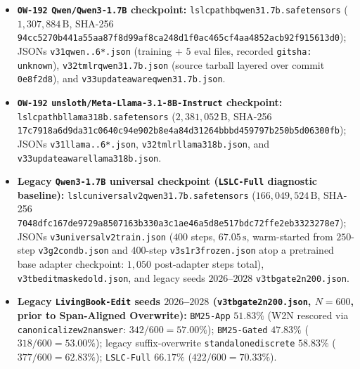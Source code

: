 \documentclass[10pt]{article}
\renewcommand{\_}{\origunderscore\allowbreak}
\begin{document}
\begin{itemize}
    \item \textbf{\texttt{OW-192} \texttt{Qwen/Qwen3-1.7B} checkpoint:} \texttt{lslc\_pathb\_qwen3\_1.7b.safetensors} ($1{,}307{,}884\,\text{B}$, SHA-256 \texttt{\scriptsize\allowbreak 94cc5270b441a55a\allowbreak a87f8d99af8ca248\allowbreak d1f0ac465cf4aa48\allowbreak 52acb92f915613d0}); JSONs \texttt{v31\_qwen\_1..6*.json} (training + $5$ eval files, recorded \texttt{git\_sha: unknown}), \texttt{v32\_tmlr\_qwen3\_1.7b.json} (source tarball layered over commit \texttt{0e8f2d8}), and \texttt{v33\_update\_aware\_qwen3\_1.7b.json}.
    \item \textbf{\texttt{OW-192} \texttt{unsloth/\allowbreak Meta-Llama-3.1-8B-Instruct} checkpoint:} \texttt{lslc\_pathb\_llama31\_8b.safetensors} ($2{,}381{,}052\,\text{B}$, SHA-256\\\texttt{\scriptsize 17c7918a6d9da31c\allowbreak 0640c94e902b8e4a\allowbreak 84d31264bbbd4597\allowbreak 97b250b5d06300fb}); JSONs \texttt{v31\_llama\_1..6*.json}, \texttt{v32\_tmlr\_llama31\_8b.json}, and \texttt{v33\_update\_aware\_llama31\_8b.json}.
    \item \textbf{Legacy \texttt{Qwen3-1.7B} universal checkpoint (\texttt{LSLC-Full} diagnostic baseline):} \texttt{lslc\_universal\_v2\_qwen3\_1.7b.safetensors} ($166{,}049{,}524\,\text{B}$, SHA-256 \texttt{\scriptsize 7048dfc167de9729\allowbreak a8507163b330a3c1\allowbreak ae46a5d8e517bdc7\allowbreak 2ffe2eb3323278e7}); JSONs \texttt{v3\_universal\_\allowbreak v2\_train.json} ($400$ steps, $67.05\,\text{s}$, warm-started from $250$-step \texttt{v3\_g2\_cond\_b.json} and $400$-step \texttt{v3\_s1\_r3\_frozen.json} atop a pretrained base adapter checkpoint: $1{,}050$ post-adapter steps total), \texttt{v3\_tb\_1\_edit\_masked\_old.json}, and legacy seeds $2026$--$2028$ \texttt{v3\_tb\_3\_gate2\_n200.json}.
    \item \textbf{Legacy \texttt{LivingBook-Edit} seeds $2026$--$2028$ (\texttt{v3\_tb\_3\_gate2\_n200.json}, $N=600$, prior to Span-Aligned Overwrite):} \texttt{BM25-App} $51.83\%$ (W2N rescored via \texttt{canonicalize\_w2n\_answer}: $342/600 = 57.00\%$); \texttt{BM25-Gated} $47.83\%$ ($318/600 = 53.00\%$); legacy suffix-overwrite \texttt{standalone\_discrete} $58.83\%$ ($377/600 = 62.83\%$); \texttt{LSLC-Full} $66.17\%$ ($422/600 = 70.33\%$).
\end{itemize}

\clearpage
\end{document}
